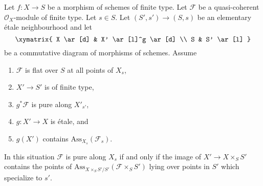 \begin{lemma}
\label{lemma-criterion}
Let $f : X \to S$ be a morphism of schemes of finite type.
Let $\mathcal{F}$ be a quasi-coherent $\mathcal{O}_X$-module
of finite type. Let $s \in S$. Let $(S', s') \to (S, s)$ be an
elementary \'etale neighbourhood and let
$$
\xymatrix{
X \ar[d] & X' \ar[l]^g \ar[d] \\
S & S' \ar[l]
}
$$
be a commutative diagram of morphisms of schemes. Assume
\begin{enumerate}
\item $\mathcal{F}$ is flat over $S$ at all points of $X_s$,
\item $X' \to S'$ is of finite type,
\item $g^*\mathcal{F}$ is pure along $X'_{s'}$,
\item $g : X' \to X$ is \'etale, and
\item $g(X')$ contains $\text{Ass}_{X_s}(\mathcal{F}_s)$.
\end{enumerate}
In this situation $\mathcal{F}$ is pure along $X_s$ if and only
if the image of $X' \to X \times_S S'$ contains the points of
$\text{Ass}_{X \times_S S'/S'}(\mathcal{F} \times_S S')$
lying over points in $S'$ which specialize to $s'$.
\end{lemma}

